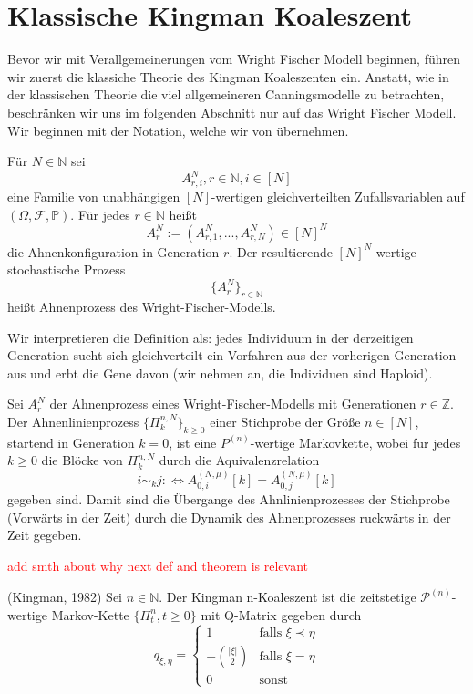 \section{Klassische Kingman Koaleszent}
Bevor wir mit Verallgemeinerungen vom Wright Fischer Modell beginnen, führen wir zuerst die klassiche Theorie des Kingman Koaleszenten ein. Anstatt, wie in der klassischen Theorie die viel allgemeineren Canningsmodelle zu betrachten, beschränken wir uns im folgenden Abschnitt nur auf das Wright Fischer Modell. Wir beginnen mit der Notation, welche wir von \cite{blath} übernehmen. 

\begin{Definition}
    Für $N \in \mathbb{N}$ sei
    \[
        A^N_{r,i}, r \in \mathbb{N}, i \in [N]
    \]
    eine Familie von unabhängigen $[N]$-wertigen gleichverteilten Zufallsvariablen auf $(\Omega,\mathcal{F},\mathbb{P})$. Für jedes $r \in \mathbb{N}$ heißt
    \[  
        A^N_r := (A^N_{r,1},...,A^N_{r,N}) \in [N]^N
    \]
    die Ahnenkonfiguration in Generation $r$. Der resultierende $[N]^N$-wertige stochastische Prozess
    \[
        \{A^N_r\}_{r \in \mathbb{N}}
    \]
    heißt Ahnenprozess des Wright-Fischer-Modells.
    
\end{Definition}
Wir interpretieren die Definition als: jedes Individuum in der derzeitigen Generation sucht sich gleichverteilt ein Vorfahren aus der vorherigen Generation aus und erbt die Gene davon (wir nehmen an, die Individuen sind Haploid).

\begin{Definition}
    Sei $A^{N}_r$ der Ahnenprozess eines Wright-Fischer-Modells mit Generationen $r \in \mathbb{Z}$. Der Ahnenlinienprozess $\{\Pi^{n,N}_k\}_{k\geq0}$ einer Stichprobe der Größe $n \in [N]$, startend in Generation $k = 0$, ist eine $P^{(n)}$-wertige Markovkette, wobei fur jedes $k \geq 0$ die Blöcke von $\Pi^{n,N}_k$
    durch die Aquivalenzrelation 
\[
    i \sim_k j : \iff A^{(N,\mu)}_{0,i}[k] = A^{(N,\mu)}_{0,j}[k]
\]
    gegeben sind. Damit sind die Übergange des Ahnlinienprozesses der Stichprobe (Vorwärts in der Zeit) durch die Dynamik des Ahnenprozesses ruckwärts in der Zeit gegeben.
\end{Definition}
\textcolor{red}{add smth about why next def and theorem is relevant}
\begin{Definition}(Kingman, 1982)
    Sei $n \in \mathbb{N}$. Der Kingman n-Koaleszent ist die zeitstetige $\mathcal{P}^{(n)}$-wertige Markov-Kette $\{\Pi^n_t, t \geq 0\}$ mit Q-Matrix gegeben durch
    \begin{equation}
        q_{\xi,\eta} =
        \begin{cases}
            1 & \text{falls } \xi \prec \eta \\
            -\binom{|\xi|}{2} & \text{falls } \xi = \eta \\
            0  & \text{sonst}
       \end{cases}
    \end{equation}
\end{Definition}


